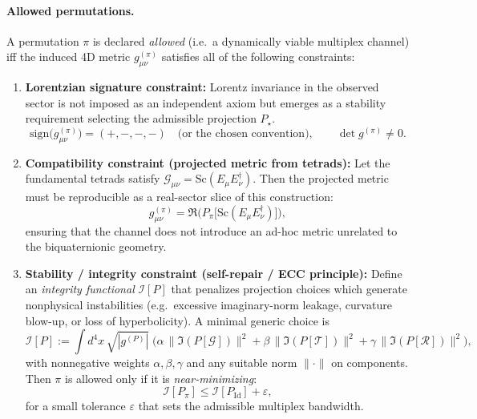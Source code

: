 \paragraph{Allowed permutations.}
A permutation $\pi$ is declared \emph{allowed} (i.e.\ a dynamically viable multiplex channel)
iff the induced 4D metric $g^{(\pi)}_{\mu\nu}$ satisfies all of the following constraints:

\begin{enumerate}
\item \textbf{Lorentzian signature constraint:}
Lorentz invariance in the observed sector is not imposed as an independent axiom but emerges as a stability requirement selecting the admissible projection $P_\star$.
\begin{equation}
\mathrm{sign}\big(g^{(\pi)}_{\mu\nu}\big) = (+,-,-,-)
\quad\text{(or the chosen convention)},
\qquad
\det g^{(\pi)} \neq 0.
\label{eq:lorentz_constraint}
\end{equation}

\item \textbf{Compatibility constraint (projected metric from tetrads):}
Let the fundamental tetrads satisfy $\mathcal{G}_{\mu\nu}=\mathrm{Sc}(E_\mu E_\nu^\dagger)$.
Then the projected metric must be reproducible as a real-sector slice of this construction:
\begin{equation}
g^{(\pi)}_{\mu\nu}
=
\Re\!\Big(
P_\pi\big[\mathrm{Sc}(E_\mu E_\nu^\dagger)\big]
\Big),
\label{eq:proj_from_tetrad}
\end{equation}
ensuring that the channel does not introduce an ad-hoc metric unrelated to the biquaternionic geometry.

\item \textbf{Stability / integrity constraint (self-repair / ECC principle):}
Define an \emph{integrity functional} $\mathcal{I}[P]$ that penalizes projection choices which generate
nonphysical instabilities (e.g.\ excessive imaginary-norm leakage, curvature blow-up, or loss of hyperbolicity).
A minimal generic choice is
\begin{equation}
\mathcal{I}[P]
:= \int d^4x\,\sqrt{|g^{(P)}|}\;
\Big(
\alpha\,\|\Im(P[\mathcal{G}])\|^2
+\beta\,\|\Im(P[\mathcal{T}])\|^2
+\gamma\,\|\Im(P[\mathcal{R}])\|^2
\Big),
\label{eq:integrity_functional}
\end{equation}
with nonnegative weights $\alpha,\beta,\gamma$ and any suitable norm $\|\cdot\|$ on components.
Then $\pi$ is allowed only if it is \emph{near-minimizing}:
\begin{equation}
\mathcal{I}[P_\pi] \le \mathcal{I}[P_{\mathrm{Id}}] + \varepsilon,
\label{eq:allowed_pi_integrity}
\end{equation}
for a small tolerance $\varepsilon$ that sets the admissible multiplex bandwidth.
\end{enumerate}

